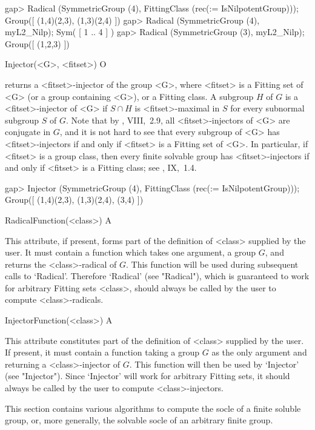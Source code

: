 \beginexample
gap> Radical (SymmetricGroup (4), FittingClass (rec(\in := IsNilpotentGroup)));
Group([ (1,4)(2,3), (1,3)(2,4) ])
gap> Radical (SymmetricGroup (4), myL2_Nilp);
Sym( [ 1 .. 4 ] ) 
gap> Radical (SymmetricGroup (3), myL2_Nilp);
Group([ (1,2,3) ])
\endexample

\>Injector(<G>, <fitset>) O

returns a <fitset>-injector of the group <G>, where <fitset> is a
Fitting set of <G> (or a group containing <G>), or a Fitting class. A
subgroup $H$ of $G$ is a <fitset>-injector of <G> if $S \cap H$ is
<fitset>-maximal in $S$ for every subnormal subgroup $S$ of $G$. Note that by 
\cite{DH92}, VIII,~2.9, all <fitset>-injectors of <G> are conjugate in $G$,
and it is not hard to see that every subgroup of <G> has <fitset>-injectors
if and only if <fitset> is a Fitting set of <G>. In particular, if <fitset>
is a group class, then every finite
solvable group has <fitset>-injectors if and only if <fitset> is a Fitting
class; see \cite{DH92}, IX,~1.4.

\beginexample
gap> Injector (SymmetricGroup (4), FittingClass (rec(\in := IsNilpotentGroup)));
Group([ (1,4)(2,3), (1,3)(2,4), (3,4) ])
\endexample

\>RadicalFunction(<class>) A

This attribute, if present, forms part of the definition of <class> supplied
by the user. It must contain a function which takes one argument, a group
$G$, and returns the <class>-radical of $G$. This function
will be used during subsequent calls to `Radical'. Therefore
`Radical' (see "Radical"), which is guaranteed to work for
arbitrary  Fitting sets <class>, should always be called by the user to
compute <class>-radicals.

\>InjectorFunction(<class>) A

This attribute constitutes part of the definition of <class> supplied by the
user. If present, it must contain a function taking a group
$G$ as the only argument and returning a <class>-injector of $G$. This
function will then be used by `Injector' (see "Injector"). Since `Injector'
will work for arbitrary  Fitting sets, it should always be called by the user
to compute <class>-injectors.


\null

This section contains various algorithms to compute the socle of a finite
soluble group, or, more generally, the solvable socle of an arbitrary finite
group. 

